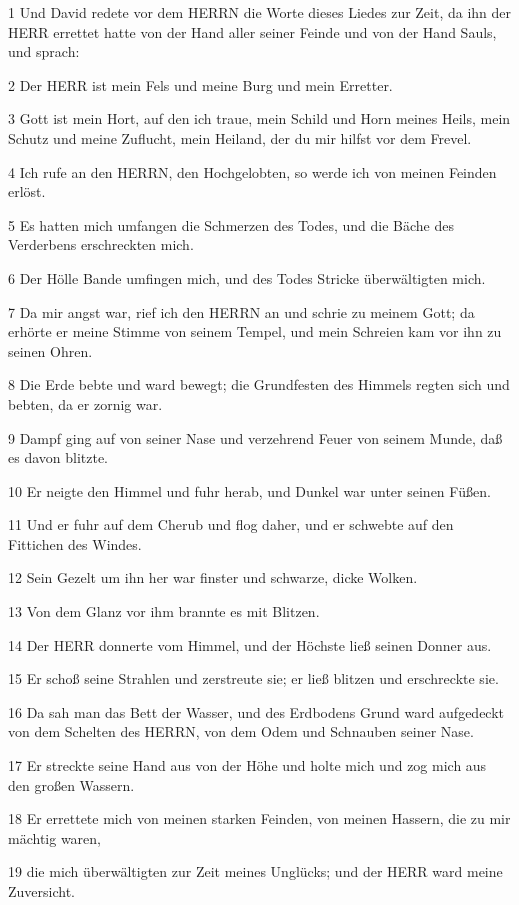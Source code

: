 \par 1 Und David redete vor dem HERRN die Worte dieses Liedes zur Zeit, da ihn der HERR errettet hatte von der Hand aller seiner Feinde und von der Hand Sauls, und sprach:
\par 2 Der HERR ist mein Fels und meine Burg und mein Erretter.
\par 3 Gott ist mein Hort, auf den ich traue, mein Schild und Horn meines Heils, mein Schutz und meine Zuflucht, mein Heiland, der du mir hilfst vor dem Frevel.
\par 4 Ich rufe an den HERRN, den Hochgelobten, so werde ich von meinen Feinden erlöst.
\par 5 Es hatten mich umfangen die Schmerzen des Todes, und die Bäche des Verderbens erschreckten mich.
\par 6 Der Hölle Bande umfingen mich, und des Todes Stricke überwältigten mich.
\par 7 Da mir angst war, rief ich den HERRN an und schrie zu meinem Gott; da erhörte er meine Stimme von seinem Tempel, und mein Schreien kam vor ihn zu seinen Ohren.
\par 8 Die Erde bebte und ward bewegt; die Grundfesten des Himmels regten sich und bebten, da er zornig war.
\par 9 Dampf ging auf von seiner Nase und verzehrend Feuer von seinem Munde, daß es davon blitzte.
\par 10 Er neigte den Himmel und fuhr herab, und Dunkel war unter seinen Füßen.
\par 11 Und er fuhr auf dem Cherub und flog daher, und er schwebte auf den Fittichen des Windes.
\par 12 Sein Gezelt um ihn her war finster und schwarze, dicke Wolken.
\par 13 Von dem Glanz vor ihm brannte es mit Blitzen.
\par 14 Der HERR donnerte vom Himmel, und der Höchste ließ seinen Donner aus.
\par 15 Er schoß seine Strahlen und zerstreute sie; er ließ blitzen und erschreckte sie.
\par 16 Da sah man das Bett der Wasser, und des Erdbodens Grund ward aufgedeckt von dem Schelten des HERRN, von dem Odem und Schnauben seiner Nase.
\par 17 Er streckte seine Hand aus von der Höhe und holte mich und zog mich aus den großen Wassern.
\par 18 Er errettete mich von meinen starken Feinden, von meinen Hassern, die zu mir mächtig waren,
\par 19 die mich überwältigten zur Zeit meines Unglücks; und der HERR ward meine Zuversicht.
